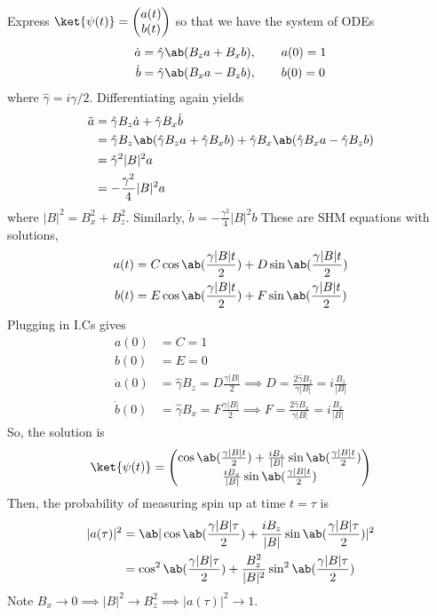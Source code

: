 \documentclass[12pt]{article}
\begin{document}
\begin{ans}
    Express $\ket{\psi(t)} = \begin{pmatrix}
        a(t) \\ 
        b(t) \\
    \end{pmatrix}$ 
    so that we have the system of ODEs
    \begin{align*}
        \dot a &= \hat{\gamma}\ab(B_z a + B_x b), \qquad a(0) = 1 \\
        \dot b &= \hat{\gamma}\ab(B_x a - B_z b), \qquad b(0) = 0
    \end{align*}
    where $\hat \gamma = i\gamma / 2$. Differentiating again yields 
    \begin{align*}
        \ddot a &= \hat \gamma B_z \dot a + \hat \gamma B_x \dot b \\ 
        &= \hat \gamma B_z \ab(\hat \gamma B_z a + \hat \gamma B_x b) + \hat \gamma B_x \ab(\hat \gamma B_x a - \hat \gamma B_z b) \\
        &= \hat \gamma^2 |B|^2a \\
        &= -\frac{\gamma^2}{4}|B|^2 a
    \end{align*}
    where $|B|^2 = B_x^2 + B_z^2$. Similarly, $\ddot b = -\frac{\gamma^2}{4}|B|^2 b$
    These are SHM equations with solutions, 
    \begin{align*}
        a(t) &= C \cos\ab(\frac{\gamma|B|t}{2}) + D\sin\ab(\frac{\gamma|B|t}{2})\\ 
        b(t) &= E \cos\ab(\frac{\gamma|B|t}{2}) + F \sin\ab(\frac{\gamma|B|t}{2})
    \end{align*}
    Plugging in I.Cs gives 
    \begin{align*}
        a(0) &= C = 1\\ 
        b(0) &= E = 0\\
        \dot a(0) &= \hat \gamma B_z = D\frac{\gamma|B|}{2} \implies D = \frac{2\hat \gamma B_z}{\gamma |B|} = i\frac{B_z}{|B|} \\
        \dot b(0) &= \hat \gamma B_x = F\frac{\gamma|B|}{2} \implies F = \frac{2\hat \gamma B_x}{\gamma |B|} = i\frac{B_x}{|B|}
    \end{align*}
    So, the solution is 
    \begin{align*}
        \ket{\psi(t)} = \begin{pmatrix}
            \cos\ab(\frac{\gamma|B|t}{2}) + \frac{iB_z}{|B|}\sin\ab(\frac{\gamma|B|t}{2})\\
            \frac{iB_x}{|B|}\sin\ab(\frac{\gamma|B|t}{2})
        \end{pmatrix}
    \end{align*}
    Then, the probability of measuring spin up at time $t = \tau$ is 
    \begin{align*}
        |a(\tau)|^2 &= \ab|\cos\ab(\frac{\gamma|B|\tau}{2}) + \frac{iB_z}{|B|}\sin\ab(\frac{\gamma|B|\tau}{2})|^2\\ 
        &= \cos^2\ab(\frac{\gamma|B|\tau}{2}) + \frac{B_z^2}{|B|^2}\sin^2\ab(\frac{\gamma|B|\tau}{2})
    \end{align*}
    Note $B_x \to 0 \implies |B|^2 \to B_z^2 \implies |a(\tau)|^2 \to 1$. 
\end{ans}
\end{document}

